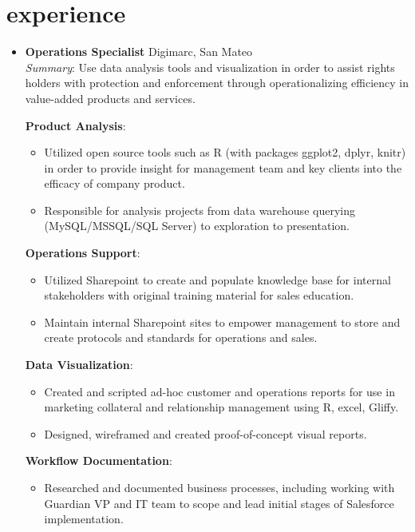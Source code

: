 \documentclass[]{friggeri-cv}
\renewenvironment{entrylist}{%
  \begin{itemize}[leftmargin=1in] %
}{%
  \end{itemize}
}
\renewcommand{\entry}[4]{%
  \item[#1]
    \textbf{#2}%
    \hfill%
    {\footnotesize\addfontfeature{Color=lightgray} #3}\\%
    #4\vspace{\parsep}%
  }
\begin{document}
\section{experience}

\begin{entrylist}
  \entry
    {07/14---curr.}
    {Operations Specialist}
    {Digimarc, San Mateo}
    {\textit{Summary}: Use data analysis tools and visualization in order to assist rights holders with protection and enforcement through operationalizing efficiency in value-added products and services.  

\textbf {Product Analysis}: 
\begin{itemize}
\item Utilized open source tools such as R (with packages ggplot2, dplyr, knitr) in order to provide insight for management team and key clients into the efficacy of company product. 
\item Responsible for analysis projects from data warehouse querying (MySQL/MSSQL/SQL Server) to exploration to presentation. 
\end{itemize}

\textbf {Operations Support}:  
\begin{itemize}
\item Utilized Sharepoint to create and populate knowledge base for internal stakeholders with original training material for sales education. 
\item Maintain internal Sharepoint sites to empower management to store and create protocols and standards for operations and sales. 
\end{itemize}

\textbf {Data Visualization}: 
\begin{itemize}
\item Created and scripted ad-hoc customer and operations reports for use in marketing collateral and relationship management using R, excel, Gliffy. 
\item Designed, wireframed and created proof-of-concept visual reports. 
\end{itemize}

\textbf {Workflow Documentation}: 
\begin{itemize}
\item Researched and documented business processes, including working with Guardian VP and IT team to scope and lead initial stages of Salesforce implementation.
\end{itemize}

}
\end{entrylist}
\end{document}
